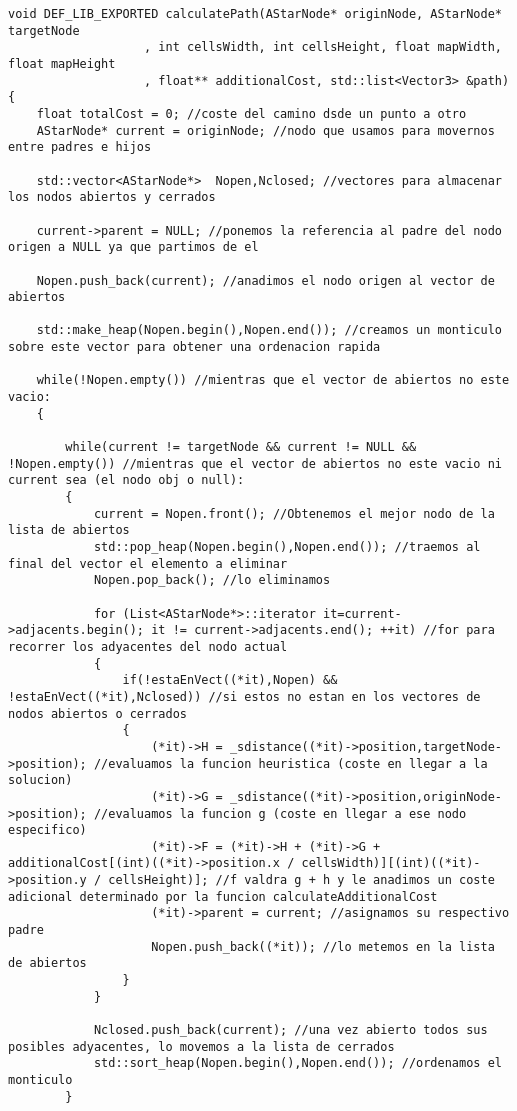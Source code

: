 \begin{lstlisting}[frame=single,basicstyle=\tiny,title={Algoritmo De Encontrar el Camino}]
void DEF_LIB_EXPORTED calculatePath(AStarNode* originNode, AStarNode* targetNode
                   , int cellsWidth, int cellsHeight, float mapWidth, float mapHeight
                   , float** additionalCost, std::list<Vector3> &path) 
{
    float totalCost = 0; //coste del camino dsde un punto a otro
    AStarNode* current = originNode; //nodo que usamos para movernos entre padres e hijos
    
	std::vector<AStarNode*>  Nopen,Nclosed;	//vectores para almacenar los nodos abiertos y cerrados
	
	current->parent = NULL; //ponemos la referencia al padre del nodo origen a NULL ya que partimos de el
	
	Nopen.push_back(current); //anadimos el nodo origen al vector de abiertos
	
	std::make_heap(Nopen.begin(),Nopen.end()); //creamos un monticulo sobre este vector para obtener una ordenacion rapida
    
    while(!Nopen.empty()) //mientras que el vector de abiertos no este vacio:
    {
    
    	while(current != targetNode && current != NULL && !Nopen.empty()) //mientras que el vector de abiertos no este vacio ni current sea (el nodo obj o null):
    	{
	       	current = Nopen.front(); //Obtenemos el mejor nodo de la lista de abiertos
	       	std::pop_heap(Nopen.begin(),Nopen.end()); //traemos al final del vector el elemento a eliminar
	       	Nopen.pop_back(); //lo eliminamos

			for (List<AStarNode*>::iterator it=current->adjacents.begin(); it != current->adjacents.end(); ++it) //for para recorrer los adyacentes del nodo actual
			{
				if(!estaEnVect((*it),Nopen) && !estaEnVect((*it),Nclosed)) //si estos no estan en los vectores de nodos abiertos o cerrados
				{
					(*it)->H = _sdistance((*it)->position,targetNode->position); //evaluamos la funcion heuristica (coste en llegar a la solucion)
					(*it)->G = _sdistance((*it)->position,originNode->position); //evaluamos la funcion g (coste en llegar a ese nodo especifico)
					(*it)->F = (*it)->H + (*it)->G + additionalCost[(int)((*it)->position.x / cellsWidth)][(int)((*it)->position.y / cellsHeight)]; //f valdra g + h y le anadimos un coste adicional determinado por la funcion calculateAdditionalCost
					(*it)->parent = current; //asignamos su respectivo padre
					Nopen.push_back((*it)); //lo metemos en la lista de abiertos
				}
			}
			
			Nclosed.push_back(current); //una vez abierto todos sus posibles adyacentes, lo movemos a la lista de cerrados
			std::sort_heap(Nopen.begin(),Nopen.end()); //ordenamos el monticulo
    	}
    

\end{lstlisting}
